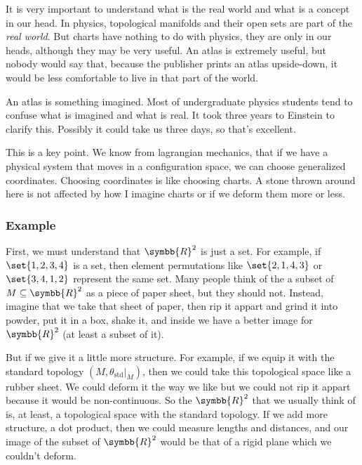 \begin{itemize}
  It is very important to understand what is the real world and what is a concept in our head.
  In physics, topological manifolds and their open sets are part of the \emph{real world}.
  But charts have nothing to do with physics, they are only in our heads, although they may be
  very useful. An atlas is extremely useful, but nobody would say that, because the publisher
  prints an atlas upside-down, it would be less comfortable to live in that part of the world.
  
  An atlas is something imagined. Most of undergraduate physics students tend to confuse what
  is imagined and what is real. It took three years to Einstein to clarify this. Possibly it
  could take us three days, so that's excellent.
  
  This is a key point. We know from lagrangian mechanics, that if we have a physical system
  that moves in a configuration space, we can choose generalized coordinates. Choosing
  coordinates is like choosing charts. A stone thrown around here is not affected by how I
  imagine charts or if we deform them more or less.
\end{itemize}

\subsubsection{Example}
First, we must understand that $\symbb{R}^2$ is just a set. For example, if $\set{1,2,3,4}$
is a set, then element permutations like $\set{2,1,4,3}$ or $\set{3,4,1,2}$ represent the same
set. Many people think of the a subset of $M\subseteq\symbb{R}^2$ as a piece of paper sheet,
but they should not. Instead, imagine that we take that sheet of paper, then rip it appart and
grind it into powder, put it in a box, shake it, and inside we have a better image for
$\symbb{R}^2$ (at least a subset of it).

But if we give it a little more structure. For example, if we equip it with the standard
topology $(M,\theta_{\text{std}}|_M)$, then we could take this topological space like a rubber
sheet. We could deform it the way we like but we could not rip it appart because it would be
non-continuous. So the $\symbb{R}^2$ that we usually think of is, at least, a topological
space with the standard topology. If we add more structure, a dot product, then we could
measure lengths and distances, and our image of the subset of $\symbb{R}^2$ would be that of
a rigid plane which we couldn't deform.

